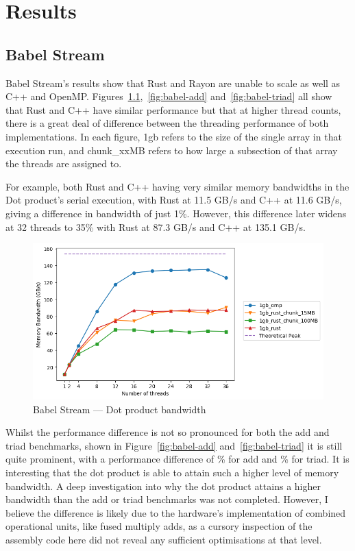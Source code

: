 \chapter{Results}
\section{Babel Stream}\label{sec:res-babel}
Babel Stream's results show that Rust and Rayon are unable to scale as well as C++ and OpenMP\@. Figures~\ref{fig:babel-dot},~\ref{fig:babel-add} and~\ref{fig:babel-triad} all show that Rust and C++ have similar performance but that at higher thread counts, there is a great deal of difference between the threading performance of both implementations. In each figure, 1gb refers to the size of the single array in that execution run, and chunk\_xxMB refers to how large a subsection of that array the threads are assigned to.

For example, both Rust and C++ having very similar memory bandwidths in the Dot product's serial execution, with Rust at 11.5 GB/s and C++ at 11.6 GB/s, giving a difference in bandwidth of just 1\%.
However, this difference later widens at 32 threads to 35\% with Rust at 87.3 GB/s and C++ at 135.1 GB/s.

\begin{figure}[h]
\centering
\includegraphics[width=.9\linewidth]{figs/babel/Dot.png}
\caption{Babel Stream --- Dot product bandwidth}\label{fig:babel-dot}
\end{figure}

Whilst the performance difference is not so pronounced for both the add and triad benchmarks, shown in Figure~\ref{fig:babel-add} and~\ref{fig:babel-triad} it is still quite prominent, with a performance difference of \% for add and \% for triad. It is interesting that the dot product is able to attain such a higher level of memory bandwidth. A deep investigation into why the dot product attains a higher bandwidth than the add or triad benchmarks was not completed. However, I believe the difference is likely due to the hardware's implementation of combined operational units, like fused multiply adds, as a cursory inspection of the assembly code here did not reveal any sufficient optimisations at that level.

